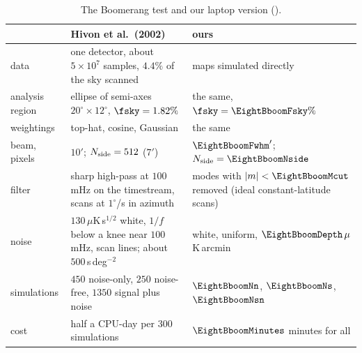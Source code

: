 \begin{table}[htbp]
\centering
\small
\renewcommand{\arraystretch}{1.2}
\begin{tabular}{@{}>{\raggedright\arraybackslash}p{2.6cm}>{\raggedright\arraybackslash}p{5.0cm}>{\raggedright\arraybackslash}p{4.6cm}@{}}
\toprule
 & Hivon et al.\ (2002) & ours \\
\midrule
data & one detector, about $5\times10^7$ samples, $4.4\%$ of the sky scanned & maps simulated directly \\
analysis region & ellipse of semi-axes $20^\circ\times12^\circ$, $\fsky=1.82\%$ & the same, $\fsky=\EightBboomFsky\%$ \\
weightings & top-hat, cosine, Gaussian & the same \\
beam, pixels & $10'$; $N_{\rm side}=512$ ($7'$) & $\EightBboomFwhm'$; $N_{\rm side}=\EightBboomNside$ \\
filter & sharp high-pass at $100$\,mHz on the timestream, scans at $1^\circ$/s in azimuth & modes with $|m|<\EightBboomMcut$ removed (ideal constant-latitude scans) \\
noise & $130\,\mu$K\,s$^{1/2}$ white, $1/f$ below a knee near $100$\,mHz, scan lines; about $500$\,s\,deg$^{-2}$ & white, uniform, $\EightBboomDepth\,\mu$K\,arcmin \\
simulations & $450$ noise-only, $250$ noise-free, $1350$ signal plus noise & $\EightBboomNn$, $\EightBboomNs$, $\EightBboomNsn$ \\
cost & half a CPU-day per $300$ simulations & $\EightBboomMinutes$ minutes for all \\
\bottomrule
\end{tabular}
\caption{The Boomerang test  and our laptop version ().}
\label{8b:tab:boom-setup}
\end{table}

